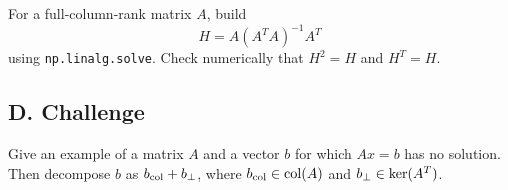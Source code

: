 \begin{exercise}
For a full-column-rank matrix $A$, build
\[
  H=A(A^TA)^{-1}A^T
\]
using \texttt{np.linalg.solve}. Check numerically that $H^2=H$ and $H^T=H$.
\end{exercise}

\subsection*{D. Challenge}

\begin{exercise}
Give an example of a matrix $A$ and a vector $b$ for which $Ax=b$ has no
solution. Then decompose $b$ as $b_{\operatorname{col}}+b_\perp$, where
$b_{\operatorname{col}}\in\operatorname{col}(A)$ and $b_\perp\in\operatorname{ker}(A^T)$.
\end{exercise}
